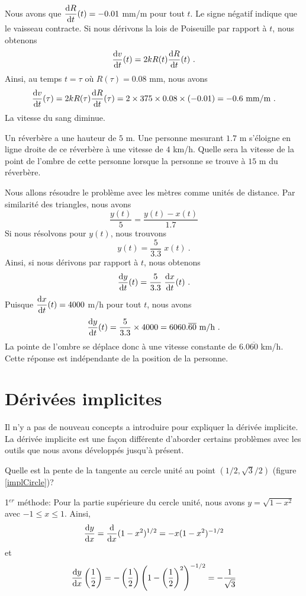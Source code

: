 {\begin{egg}
Nous avons que $\displaystyle \dydx{R}{t}(t) = -0.01$ mm/m pour tout $t$.
Le signe négatif indique que le vaisseau contracte.  Si nous dérivons la
lois de Poiseuille par rapport à $t$, nous obtenons
\[
\dydx{v}{t}(t) = 2k R(t) \dydx{R}{t}(t) \ .
\]
Ainsi, au temps $t = \tau$ où $R(\tau) = 0.08$ mm, nous avons
\[
\dydx{v}{t}(\tau) = 2k R(\tau) \dydx{R}{t}(\tau) 
= 2\times 375\times 0.08 \times (-0.01) = -0.6 \ \text{mm/m} \ .
\]
La vitesse du sang diminue.
\end{egg}

\begin{egg}
Un réverbère a une hauteur de $5$ m.  Une personne mesurant $1.7$ m
s'éloigne en ligne droite de ce réverbère à une vitesse de $4$ km/h.
Quelle sera la vitesse de la point de l'ombre de cette personne
lorsque la personne se trouve à $15$ m du réverbère.

Nous allons résoudre le problème avec les mètres comme unités de distance.
Par similarité des triangles, nous avons
\[
\frac{y(t)}{5} = \frac{y(t)-x(t)}{1.7}
\]
Si nous résolvons pour $y(t)$, nous trouvons
\[
y(t) = \frac{5}{3.3}\; x(t) \ .
\]
Ainsi, si nous dérivons par rapport à $t$, nous obtenons
\[
\dydx{y}{t}(t) = \frac{5}{3.3} \; \dydx{x}{t}(t) \ .
\]
Puisque $\displaystyle \dydx{x}{t}(t) = 4000$ m/h pour tout $t$, nous avons
\[
\dydx{y}{t}(t) = \frac{5}{3.3} \times 4000 = 6060.\overline{60}
\ \text{m/h} \ .
\]
La pointe de l'ombre se déplace donc à une vitesse constante de
$6.0\overline{60}$ km/h.  Cette réponse est indépendante de la
position de la personne.
\end{egg}

\section{Dérivées implicites \eng}

Il n'y a pas de nouveau concepts a introduire pour expliquer la
dérivée implicite.  La dérivée implicite est une façon
différente d'aborder certains problèmes avec les outils que nous
avons développés jusqu'à présent.

\begin{egg}
Quelle est la pente de la tangente au cercle unité au point
$(1/2, \sqrt{3}/2)$ (figure \ref{implCircle})?

1$^{er}$ méthode: Pour la partie supérieure du cercle unité, nous avons
$y = \sqrt{1-x^2}$ avec $-1 \leq x \leq 1$.  Ainsi,
\[
\dydx{y}{x} = \dfdx{(1-x^2)^{1/2}}{x} = -x (1-x^2)^{-1/2}
\]
et
\[
\dydx{y}{x}\left(\frac{1}{2}\right)
= -\left(\frac{1}{2}\right) \left(1-\left(\frac{1}{2}\right)^2\right)^{-1/2}
= - \frac{1}{\sqrt{3}}
\]


\end{egg}}
